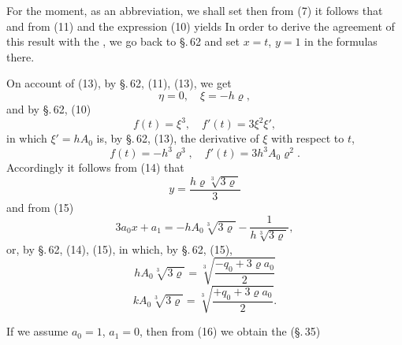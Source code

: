 
For the moment, as an abbreviation, we shall set
then from (7) it follows that
and from (11)
and the expression (10) yields
In order to derive the agreement of this result with the , we go back to \S.\,62 and set $x = t$, $y = 1$ in the formulas there.

On account of (13), by \S.\,62, (11), (13), we get
\[
\eta = 0, \quad \xi = -h \varrho,
\]
and by \S.\,62, (10)
\[
f(t) = \xi^3, \quad f'(t) = 3 \xi^2 \xi',
\]
in which $\xi' = h A_0$ is, by \S.\,62, (13), the derivative of $\xi$ with respect to $t$,
\[
f(t) = -h^3 \varrho^3, \quad f'(t) = 3 h^3 A_0 \varrho^2.
\]
Accordingly it follows from (14) that
\[
y = \frac{h \varrho \sqrt[3]{3 \varrho}}{3}
\]
and from (15)
\[
3 a_0 x + a_1 = -h A_0 \sqrt[3]{3 \varrho} - \frac{1}{h \sqrt[3]{3 \varrho}},
\]
or, by \S.\,62, (14), (15),
in which, by \S.\,62, (15),
\[
h A_0 \sqrt[3]{3 \varrho} = \sqrt[3]{\frac{-q_0 + 3 \varrho a_0}{2}}
\]
\[
k A_0 \sqrt[3]{3 \varrho} = \sqrt[3]{\frac{+q_0 + 3 \varrho a_0}{2}}.
\]

If we assume $a_0 = 1$, $a_1 = 0$, then from (16) we obtain the  (\S.\,35)
